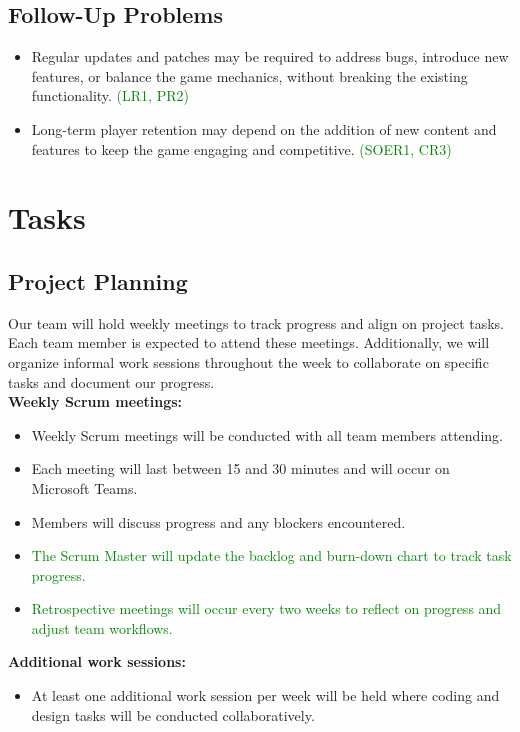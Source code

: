 \documentclass[12pt]{article}
\newcommand{\added}[1]{\textcolor{green}{#1}}
\begin{document}
\subsection{Follow-Up Problems}
\begin{itemize}
    \item Regular updates and patches may be required to address bugs, introduce new features, or balance the game mechanics, without breaking the existing functionality. \added{(LR1, PR2)}
    \item Long-term player retention may depend on the addition of new content and features to keep the game engaging and competitive. \added{(SOER1, CR3)}
\end{itemize}

\section{Tasks}

\subsection{Project Planning}
Our team will hold weekly meetings to track progress and align on project tasks. Each team member is expected to attend these meetings. Additionally, we will organize informal work sessions throughout the week to collaborate on specific tasks and document our progress. \\

\textbf{Weekly Scrum meetings:}
\begin{itemize}
    \item Weekly Scrum meetings will be conducted with all team members attending.
    \item Each meeting will last between 15 and 30 minutes and will occur on Microsoft Teams.
    \item Members will discuss progress and any blockers encountered. 
    \item \added{The Scrum Master will update the backlog and burn-down chart to track task progress.}
    \item \added{Retrospective meetings will occur every two weeks to reflect on progress and adjust team workflows.}
\end{itemize}

\textbf{Additional work sessions:}
\begin{itemize}
    \item At least one additional work session per week will be held where coding and design tasks will be conducted collaboratively.
\end{itemize}
\end{document}
